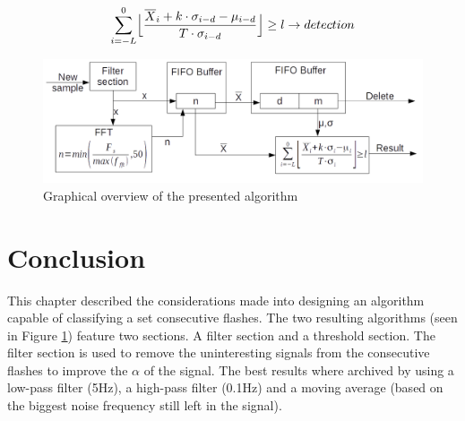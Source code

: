 \begin{equation}
\label{Zscore_improved}
\sum_{i = -L}^{0} \Bigl\lfloor{\frac{\overline{X}_i + k\cdot\sigma_{i-d} - \mu_{i-d}}{T \cdot \sigma_{i-d}}} \Bigr\rfloor \geq l \rightarrow detection 
\end{equation}

\begin{figure}
	\centering     %
	\includegraphics[width=120mm]{pics/ThresholdAlgorithmOverview_double_FIFO.png}
	\caption{Graphical overview of the presented algorithm\label{fig:fullAlgorithm}}
\end{figure}

\section{Conclusion}

This chapter described the considerations made into designing an algorithm capable of classifying a set consecutive flashes. The two resulting algorithms (seen in Figure \ref{fig:fullAlgorithm}) feature two sections. A filter section and a threshold section. The filter section is used to remove the uninteresting signals from the consecutive flashes to improve the $\alpha$ of the signal. The best results where archived by using a low-pass filter (5Hz), a high-pass filter (0.1Hz) and a moving average (based on the biggest noise frequency still left in the signal).